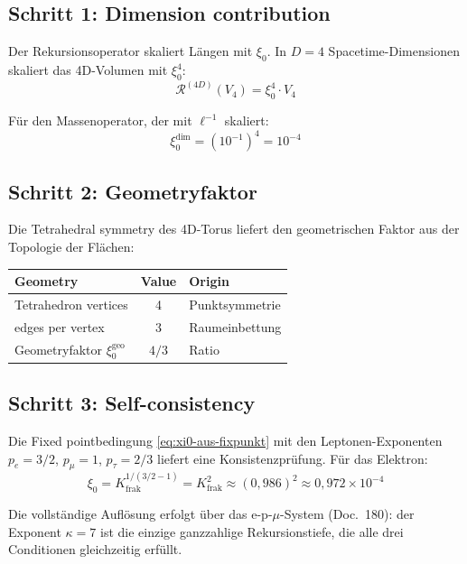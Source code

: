 \subsection{Schritt 1: Dimension contribution}

Der Rekursionsoperator skaliert Längen mit $\xi_0$. In $D=4$
Spacetime-Dimensionen skaliert das 4D-Volumen mit $\xi_0^4$:
\begin{equation}
  \mathcal{R}^{(4D)}(V_4) = \xi_0^4 \cdot V_4
\end{equation}

Für den Massenoperator, der mit $\ell^{-1}$ skaliert:
\begin{equation}
  \xi_0^{\text{dim}} = (10^{-1})^4 = 10^{-4}
\end{equation}

\subsection{Schritt 2: Geometryfaktor}

Die Tetrahedral symmetry des 4D-Torus liefert den geometrischen Faktor
aus der Topologie der Flächen:

\begin{center}
{\footnotesize
\begin{tabular}{lcl}
\toprule
\textbf{Geometry} & \textbf{Value} & \textbf{Origin} \\
\midrule
Tetrahedron vertices & 4 & Punktsymmetrie \\
edges per vertex & 3 & Raumeinbettung \\
Geometryfaktor $\xi_0^{\text{geo}}$ & $4/3$ & Ratio \\
\bottomrule
\end{tabular}}
\end{center}

\subsection{Schritt 3: Self-consistency}

Die Fixed pointbedingung \eqref{eq:xi0-aus-fixpunkt} mit den Leptonen-Exponenten
$p_e = 3/2$, $p_\mu = 1$, $p_\tau = 2/3$ liefert eine Konsistenzprüfung.
Für das Elektron:
\begin{equation}
  \xi_0 = K_{\text{frak}}^{1/(3/2 - 1)}
  = K_{\text{frak}}^2
  \approx (0{,}986)^2 \approx 0{,}972 \times 10^{-4}
\end{equation}

Die vollständige Auflösung erfolgt über das e-p-$\mu$-System
(Doc.~180): der Exponent $\kappa = 7$ ist die einzige ganzzahlige
Rekursionstiefe, die alle drei Conditionen gleichzeitig erfüllt.

